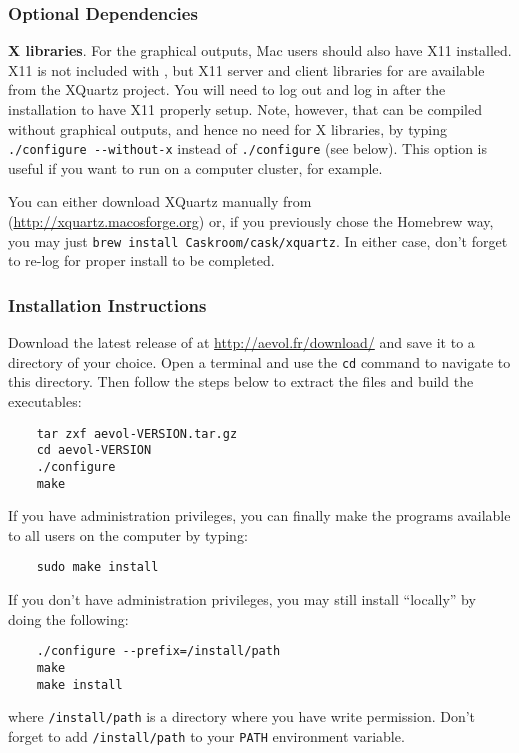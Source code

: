 \subsubsection{Optional Dependencies}
\begin{myList} 
\item \textbf{X libraries}. For the graphical outputs, Mac users
  should also have X11 installed. X11 is not included with \macos{},
  but X11 server and client libraries for \macos{} are available from the
  XQuartz project. You will need
  to log out and log in after the installation to have X11 properly
  setup. Note, however, that \aevol{} can be compiled without
  graphical outputs, and hence no need for X libraries, by typing
  \verb?./configure --without-x?  instead of \verb?./configure?  (see
  below). This option is useful if you want to run \aevol{} on a
  computer cluster, for example.
  
  You can either download XQuartz manually from
  (\url{http://xquartz.macosforge.org}) or, if you previously chose
  the Homebrew way, you may just
  \verb?brew install Caskroom/cask/xquartz?. In either case, don't
  forget to re-log for proper install to be completed.

\end{myList}

\subsubsection{Installation Instructions}
Download the latest release of \aevol{} at
\url{http://aevol.fr/download/} and save it to a directory of your
choice. Open a terminal and use the \verb+cd+ command to navigate to
this directory. Then follow the steps below to extract the files and
build the executables:

\begin{verbatim}
	tar zxf aevol-VERSION.tar.gz
	cd aevol-VERSION
	./configure
	make
\end{verbatim}

If you have administration privileges, you can finally make the
\aevol{} programs available to all users on the computer by typing:
\begin{verbatim}
	sudo make install
\end{verbatim}

If you don't have administration privileges, you may still install
\aevol{} ``locally'' by doing the following:
\begin{verbatim}
	./configure --prefix=/install/path
	make
	make install
\end{verbatim}
where \verb?/install/path? is a directory where you have write
permission. Don't forget to add \verb?/install/path? to your
\verb?PATH? environment variable.


\clearemptydoublepage






